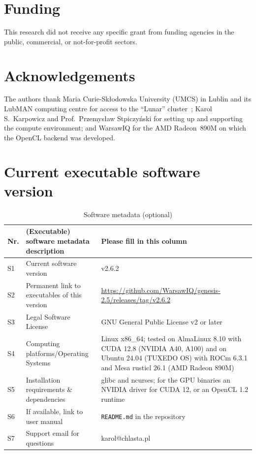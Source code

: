 \documentclass[preprint,12pt,a4paper]{elsarticle}
\begin{document}
\section*{Funding}

This research did not receive any specific grant from funding agencies in the
public, commercial, or not-for-profit sectors.

\section*{Acknowledgements}

The authors thank Maria Curie-Sk\l{}odowska University (UMCS) in Lublin and its
LubMAN computing centre for access to the ``Lunar'' cluster~\cite{umcs_lunar2015};
Karol S.~Karpowicz and Prof.~Przemys\l{}aw Stpiczy\'nski for setting up and supporting
the compute environment; and WarsawIQ for the AMD Radeon~890M on which the OpenCL
backend was developed.



\section*{Current executable software version}

\begin{table}[!h]
\begin{tabular}{|l|p{6.0cm}|p{6.0cm}|}
\hline
\textbf{Nr.} & \textbf{(Executable) software metadata description} & \textbf{Please fill in this column} \\
\hline
S1 & Current software version & v2.6.2 \\
\hline
S2 & Permanent link to executables of this version & \url{https://github.com/WarsawIQ/genesis-2.5/releases/tag/v2.6.2} \\
\hline
S3 & Legal Software License & GNU General Public License v2 or later \\
\hline
S4 & Computing platforms/Operating Systems & Linux x86\_64; tested on AlmaLinux 8.10 with CUDA 12.8 (NVIDIA A40, A100) and on Ubuntu 24.04 (TUXEDO OS) with ROCm 6.3.1 and Mesa rusticl 26.1 (AMD Radeon 890M) \\
\hline
S5 & Installation requirements \& dependencies & glibc and ncurses; for the GPU binaries an NVIDIA driver for CUDA 12, or an OpenCL 1.2 runtime \\
\hline
S6 & If available, link to user manual & \texttt{README.md} in the repository \\
\hline
S7 & Support email for questions & karol@chlasta.pl \\
\hline
\end{tabular}
\caption{Software metadata (optional)}
\end{table}
\end{document}
